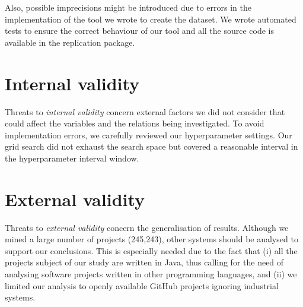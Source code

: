 Also, possible imprecisions might be introduced due to errors in the implementation of the tool we wrote to create the dataset. We wrote automated tests to ensure the correct behaviour of our tool and all the source code is available in the replication package.

\section{Internal validity}
Threats to \textit{internal validity} concern external factors we did not consider that could affect the variables and the relations being investigated. To avoid implementation errors, we carefully reviewed our hyperparameter settings. Our grid search did not exhaust the search space but covered a reasonable interval in the hyperparameter interval window.

\section{External  validity}
Threats to \textit{external validity} concern the generalisation of results. Although we mined a large number of projects (245,243), other systems should be analysed to support our conclusions. This is especially needed due to the fact that (i) all the projects subject of our study are written in Java, thus calling for the need of analysing software projects written in other programming languages, and (ii) we limited our analysis to openly available GitHub projects ignoring industrial systems.